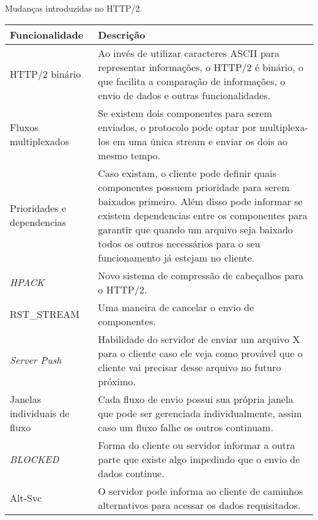 \begin{quadro}[!htb]
	\centering
	\caption{Mudanças introduzidas no HTTP/2. \label{qua:http2novo}}
	\begin{tabularx}{\textwidth}{| X | X |}
		\hline
		\textbf{Funcionalidade} & \textbf{Descrição} \\
		\hline
		HTTP/2 binário & Ao invés de utilizar caracteres ASCII para representar informações, o HTTP/2 é binário, o que facilita a comparação de informações, o envio de dados e outras funcionalidades. \\
		\hline
		Fluxos multiplexados & Se existem dois componentes para serem enviados, o protocolo pode optar por multiplexa-los em uma única stream e enviar os dois ao mesmo tempo. \\
		\hline
		Prioridades e dependencias & Caso existam, o cliente pode definir quais componentes possuem prioridade para serem baixados primeiro. Além disso pode informar se existem dependencias entre os  componentes para garantir que quando um arquivo seja baixado todos os outros necessários para o seu funcionamento já estejam no cliente. \\
		\hline
		\textit{HPACK} & Novo sistema de compressão de cabeçalhos para o HTTP/2. \\
		\hline
		RST\_STREAM & Uma maneira de cancelar o envio de componentes. \\
		\hline
		\textit{Server Push} & Habilidade do servidor de enviar um arquivo X para o cliente caso ele veja como provável que o cliente vai precisar desse arquivo no futuro próximo. \\
		\hline
		Janelas individuais de fluxo & Cada fluxo de envio possui sua própria janela que pode ser gerenciada individualmente, assim caso um fluxo falhe os outros continuam. \\
		\hline
		\textit{BLOCKED} & Forma do cliente ou servidor informar a outra parte que existe algo impedindo que o envio de dados continue. \\
		\hline
		Alt-Svc & O servidor pode informa ao cliente de caminhos alternativos para acessar os dados requisitados. \\
		\hline
	\end{tabularx}
\end{quadro}